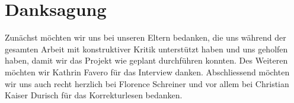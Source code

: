 
\chapter*{Danksagung}
Zunächst möchten wir uns bei unseren Eltern bedanken, die uns während der gesamten Arbeit mit konstruktiver Kritik unterstützt haben und uns geholfen haben, damit wir das Projekt wie geplant durchführen konnten. Des Weiteren möchten wir Kathrin Favero für das Interview danken.
\newline
Abschliessend möchten wir uns auch recht herzlich bei Florence Schreiner und vor allem bei Christian Kaiser Durisch für das Korrekturlesen bedanken.
\pagebreak